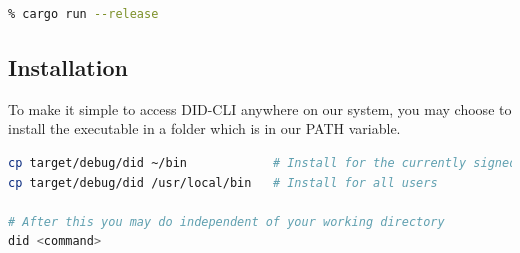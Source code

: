 \begin{lstlisting}[language=bash]
% cargo run
% cargo run --release
\end{lstlisting}

\hypertarget{installation}{%
\subsection{Installation}\label{installation}}

To make it simple to access DID-CLI anywhere on our system, you may
choose to install the executable in a folder which is in our PATH
variable.

\begin{lstlisting}[language=bash]
cp target/debug/did ~/bin            # Install for the currently signed in user
cp target/debug/did /usr/local/bin   # Install for all users

# After this you may do independent of your working directory
did <command>
\end{lstlisting}
